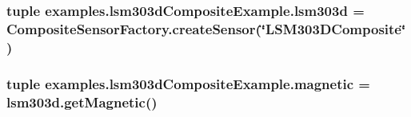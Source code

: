 \subsubsection[{lsm303d}]{\setlength{\rightskip}{0pt plus 5cm}tuple examples.\+lsm303d\+Composite\+Example.\+lsm303d = {\bf Composite\+Sensor\+Factory.\+create\+Sensor}(\char`\"{}L\+S\+M303\+D\+Composite\char`\"{})}\label{namespaceexamples_1_1lsm303dCompositeExample_ad02f156b63785510a1bfe08ad8ce3e12}
\hypertarget{namespaceexamples_1_1lsm303dCompositeExample_a307ea9829e8bd013e8071040bd91772e}{}
\subsubsection[{magnetic}]{\setlength{\rightskip}{0pt plus 5cm}tuple examples.\+lsm303d\+Composite\+Example.\+magnetic = lsm303d.\+get\+Magnetic()}\label{namespaceexamples_1_1lsm303dCompositeExample_a307ea9829e8bd013e8071040bd91772e}
